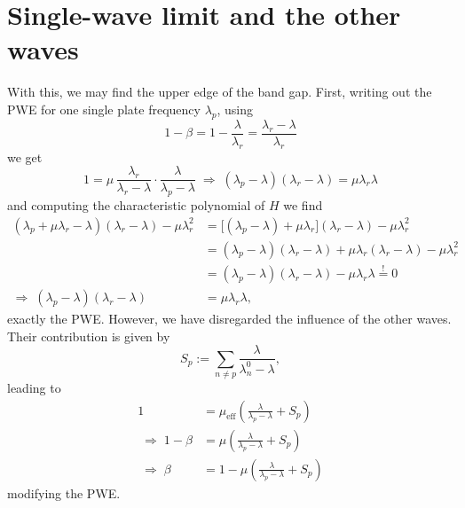 \section{Single-wave limit and the other waves}

With this, we may find the upper edge of the band gap. First, writing out the
PWE for one single plate frequency $\lambda_p$, using
\begin{equation}
  1 - \beta = 1 - \frac{\lambda}{\lambda_r} = \frac{\lambda_r - \lambda}{\lambda_r}
\end{equation}
we get
\begin{equation}
  1 = \mu\,\frac{\lambda_r}{\lambda_r - \lambda}\cdot\frac{\lambda}{\lambda_p - \lambda}
  \;\Rightarrow\;
  (\lambda_p - \lambda)(\lambda_r - \lambda) = \mu\lambda_r\lambda
\end{equation}
and computing the characteristic polynomial of $H$ we find
\begin{equation}
\begin{aligned}
  (\lambda_p + \mu\lambda_r - \lambda)(\lambda_r - \lambda) - \mu\lambda_r^2
  &= \bigl[(\lambda_p - \lambda) + \mu\lambda_r\bigr](\lambda_r - \lambda) - \mu\lambda_r^2 \\
  &= (\lambda_p - \lambda)(\lambda_r - \lambda) + \mu\lambda_r(\lambda_r - \lambda) - \mu\lambda_r^2 \\
   & = (\lambda_p - \lambda)(\lambda_r - \lambda) - \mu\lambda_r\lambda \overset{!}{=} 0 \\
  \Rightarrow\; (\lambda_p - \lambda)(\lambda_r - \lambda) &= \mu\lambda_r\lambda ,
\end{aligned}
\end{equation}
exactly the PWE. However, we have disregarded the influence of the other waves.
Their contribution is given by
\begin{equation}
  S_p := \sum_{n \neq p} \frac{\lambda}{\lambda_n^0 - \lambda} ,
\end{equation}
leading to
\begin{equation}
\begin{split}
  1 &= \mu_\mathrm{eff}\left(\frac{\lambda}{\lambda_p - \lambda} + S_p\right) \\
  \;\Rightarrow\;
  1 - \beta &= \mu\left(\frac{\lambda}{\lambda_p - \lambda} + S_p\right) \\
  \;\Rightarrow\;
  \beta &= 1 - \mu\left(\frac{\lambda}{\lambda_p - \lambda} + S_p\right)
  \label{eq:beta_general}
  \end{split}
\end{equation}
modifying the PWE.

